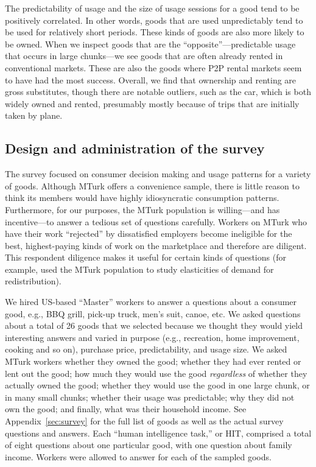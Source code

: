 \documentclass[11pt]{article}
\begin{document}
The predictability of usage and the size of usage sessions for a good tend to be positively correlated.
In other words, goods that are used unpredictably tend to be used for relatively short periods.
These kinds of goods are also more likely to be owned. 
When we inspect goods that are the ``opposite''---predictable usage that occurs in large chunks---we see goods that are often already rented in conventional markets.
These are also the goods where P2P rental markets seem to have had the most success.
Overall, we find that ownership and renting are gross substitutes, though there are notable outliers, such as the car, which is both widely owned and rented, presumably mostly because of trips that are initially taken by plane. 

\subsection{Design and administration of the survey}
The survey focused on consumer decision making and usage patterns for a variety of goods. 
Although MTurk offers a convenience sample, there is little reason to think its members would have highly idiosyncratic consumption patterns. 
Furthermore, for our purposes, the MTurk population is willing---and has incentive---to answer a tedious set of questions carefully.
Workers on MTurk who have their work ``rejected'' by dissatisfied employers become ineligible for the best, highest-paying kinds of work on the marketplace and therefore are diligent. 
This respondent diligence makes it useful for certain kinds of questions (for example, \cite{kuziemko2013elastic} used the MTurk population to study elasticities of demand for redistribution).  

We hired US-based ``Master'' workers to answer a questions about a consumer good, e.g., BBQ grill, pick-up truck, men's suit, canoe, etc.
We asked questions about a total of 26 goods that we selected because we thought they would yield interesting answers and varied in purpose (e.g., recreation, home improvement, cooking and so on), purchase price, predictability, and usage size. 
We asked MTurk workers whether they owned the good; whether they had ever rented or lent out the good; how much they would use the good \emph{regardless} of whether they actually owned the good; whether they would use the good in one large chunk, or in many small chunks; whether their usage was predictable; why they did not own the good; and finally, what was their household income. 
See Appendix~\ref{sec:survey} for the full list of goods as well as the actual survey questions and answers.  
Each ``human intelligence task,'' or HIT, comprised a total of eight questions about one particular good, with one question about family income. 
Workers were allowed to answer for each of the sampled goods.  
\end{document}
